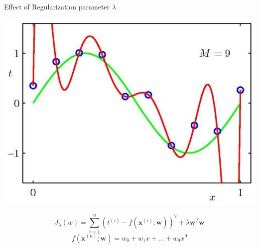 \documentclass[serif, aspectratio=169]{beamer}
\begin{document}
\begin{frame}{Effect of Regularization parameter \( \lambda \)}
\begin{minipage}{0.32\textwidth}
    \end{minipage} %
    \begin{minipage}{0.32\textwidth}
        \centering
        \includegraphics[width=1.0\textwidth]{pic/Regularization/regularization_inf.png}
    \end{minipage}
    \vfill
    \[
    J_{\lambda}(w) = \sum_{i=1}^n \left( t^{(i)} - f(\mathbf{x}^{(i)}; \mathbf{w}) \right)^2 + \lambda \mathbf{w}^T\mathbf{w}
    \]
    \[ 
    f(\mathbf{x}^{(n)}; \mathbf{w}) = w_0 + w_1 x + \dots + w_9 x^9
    \]
    \vfill
\end{frame}
\end{document}
